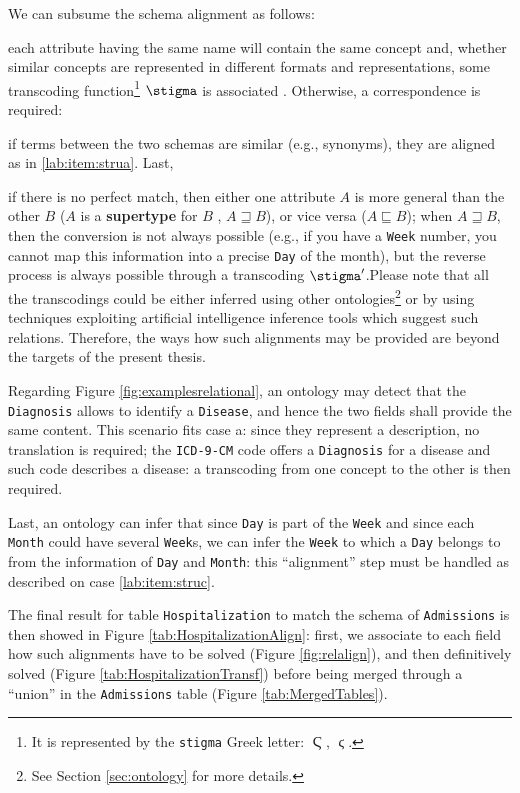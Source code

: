 We can subsume the schema alignment as follows:
\begin{alphalist}
	\item \label{lab:item:strua} each attribute having the same name will contain the same concept and, whether similar concepts are represented in different formats and representations, some transcoding function\footnote{It is represented by the \texttt{stigma} Greek letter: $\Stigma$, $\stigma$. } $\transcoding$ is associated \cite{GolfarelliMPRT12}. Otherwise, a correspondence is required:
	\item \label{lab:item:strub} if terms between the two schemas are similar (e.g., synonyms), they are aligned as in \ref{lab:item:strua}. Last, 
	\item \label{lab:item:struc} if there is no perfect match, then either one attribute $A$ is more general than the other $B$ ($A$ is a \textbf{supertype} for $B$  \cite{deII}, $A\sqsupseteq B$), or vice versa ($A\sqsubseteq B$); when $A\sqsupseteq B$, then the conversion is not always possible (e.g., if you have a \texttt{Week} number, you cannot map this information into a precise \texttt{Day} of the month), but the reverse process is always possible through a transcoding $\transcoding'$.Please note that all the transcodings could be either inferred using other ontologies\footnote{See Section \ref{sec:ontology} for more details.} or by using techniques exploiting artificial intelligence inference tools which suggest such relations. Therefore, the ways how such alignments may be provided are beyond the targets of the present thesis.
\end{alphalist}

\begin{example}[continues=ex:firstThesis]
 Regarding Figure \ref{fig:examplesrelational}, an ontology may detect that the \texttt{Diagnosis} allows to identify a \texttt{Disease}, and hence the two fields shall provide the same content. This scenario fits case a: since they represent a description, no translation is required; the \texttt{ICD-9-CM} code offers a \texttt{Diagnosis} for a disease and such code describes a disease: a transcoding from one concept to the other is then required.

  Last, an ontology can infer that since \texttt{Day} is part of the \texttt{Week} and since each \texttt{Month} could have several \texttt{Week}s, we can infer the \texttt{Week} to which a \texttt{Day} belongs to from the information of \texttt{Day} and \texttt{Month}: this  ``alignment'' step must be handled as described on case \ref{lab:item:struc}.

  The final result for table \texttt{Hospitalization} to match the schema of \texttt{Admissions} is then showed in Figure \ref{tab:HospitalizationAlign}: first, we associate to each field how such alignments have to be solved (Figure \vref{fig:relalign}), and then definitively solved (Figure \ref{tab:HospitalizationTransf}) before being merged through a ``union'' in the \texttt{Admissions} table (Figure \ref{tab:MergedTables}).
\end{example}





